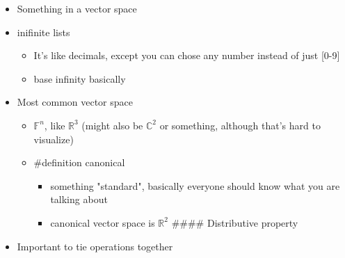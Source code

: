 \documentclass[letterpaper]{article}
\begin{document}
\begin{itemize}
\item Something in a vector space
\item inifinite lists

\begin{itemize}
\item It's like decimals, except you can chose any number instead of just
[0-9]
\item base infinity basically
\end{itemize}

\item Most common vector space

\begin{itemize}
\item \(\mathbb{F}^n\), like \(\mathbb{R}^3\) (might also be
\(\mathbb{C}^2\) or something, although that's hard to visualize)
\item \#definition canonical

\begin{itemize}
\item something "standard", basically everyone should know what you are
talking about
\item canonical vector space is \(\mathbb{R}^2\) \#\#\#\# Distributive
property
\end{itemize}
\end{itemize}

\item Important to tie operations together
\end{itemize}
\end{document}
